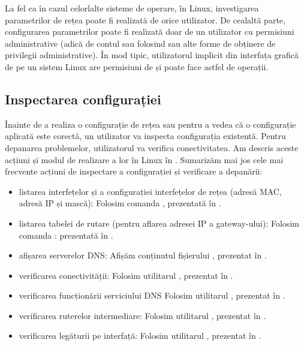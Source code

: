 La fel ca în cazul celorlalte sisteme de operare, în Linux, investigarea parametrilor de rețea poate fi realizată de orice utilizator.
De cealaltă parte, configurarea parametrilor poate fi realizată doar de un utilizator cu permisiuni administrative (adică de contul  sau folosind  sau alte forme de obținere de privilegii administrative).
În mod tipic, utilizatorul implicit din interfața grafică de pe un sistem Linux are permisiuni de  și poate face astfel de operații.

\subsection{Inspectarea configurației}
\label{sec:net:linux-config:inspect}

Înainte de a realiza o configurație de rețea sau pentru a vedea că o configurație aplicată este corectă, un utilizator va inspecta configurația existentă.
Pentru depanarea problemelor, utilizatorul va verifica conectivitatea.
Am descris aceste acțiuni și modul de realizare a lor în Linux în .
Sumarizăm mai jos cele mai frecvente acțiuni de inspectare a configurației și verificare a depanării:

\begin{itemize}
  \item listarea interfețelor și a configurației interfețelor de rețea (adresă MAC, adresă IP și mască):
    Folosim comanda , prezentată în .
  \item listarea tabelei de rutare (pentru aflarea adresei IP a gateway-ului):
    Folosim comanda : prezentată în .
  \item afișarea serverelor DNS:
    Afișăm conținutul fișierului , prezentat în .
  \item verificarea conectivității:
    Folosim utilitarul , prezentat în .
  \item verificarea funcționării serviciului DNS
    Folosim utilitarul , prezentat în .
  \item verificarea ruterelor intermediare:
    Folosim utilitarul , prezentat în .
  \item verificarea legăturii pe interfață:
    Folosim utilitarul , prezentat în .
\end{itemize}

